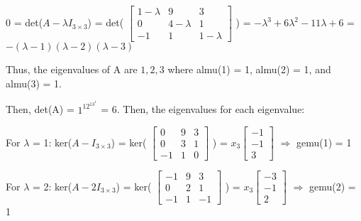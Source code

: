     \begin{tbox}
        0 = det($A - \lambda I_{3 \times 3}$) =
        det(
        \scriptsize
        $\begin{bmatrix}
            1-\lambda & 9 & 3 \\
            0 & 4-\lambda & 1 \\
            -1 & 1 & 1-\lambda
        \end{bmatrix}$
        \normalsize)
        = $-\lambda^3 + 6\lambda^2 - 11\lambda + 6$
        = $-(\lambda-1)(\lambda-2)(\lambda-3)$

        Thus, the eigenvalues of A are $1,2,3$ where
        almu(1) = 1, almu(2) = 1, and almu(3) = 1.

        Then, det(A) = $1^12^13^1$ = 6.
        Then, the eigenvalues for each eigenvalue:

        \hspace{0.5cm}
        For $\lambda$ = 1:
        \hspace{0.5cm}
        ker($A - I_{3 \times 3}$) =
        ker(
        \scriptsize
        $\begin{bmatrix}
            0 & 9 & 3 \\
            0 & 3 & 1 \\
            -1 & 1 & 0
        \end{bmatrix}$
        \normalsize) =
        \scriptsize
        $x_3\begin{bmatrix}
            -1 \\
            -1 \\
            3
        \end{bmatrix}$
        \normalsize
        \hspace{0.5cm}
        $\Rightarrow$
        \hspace{0.5cm}
        gemu(1) = 1

        \hspace{0.5cm}
        For $\lambda$ = 2:
        \hspace{0.5cm}
        ker($A - 2I_{3 \times 3}$) =
        ker(
        \scriptsize
        $\begin{bmatrix}
            -1 & 9 & 3 \\
            0 & 2 & 1 \\
            -1 & 1 & -1
        \end{bmatrix}$
        \normalsize) =
        \scriptsize
        $x_3\begin{bmatrix}
            -3 \\
            -1 \\
            2
        \end{bmatrix}$
        \normalsize
        \hspace{0.1cm}
        $\Rightarrow$
        \hspace{0.5cm}
        gemu(2) = 1


\end{tbox}
